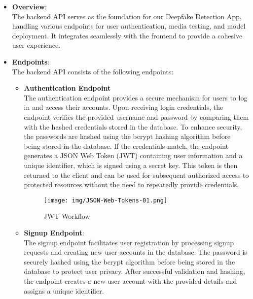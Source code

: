\begin{itemize}
      \item \textbf{Overview}:\\
            The backend API serves as the foundation for our Deepfake Detection App, handling various endpoints for user authentication, media testing, and model deployment. It integrates seamlessly with the frontend to provide a cohesive user experience.

      \item \textbf{Endpoints}:\\
            The backend API consists of the following endpoints:

            \begin{itemize}

                  \item \textbf{Authentication Endpoint}\\
                        The authentication endpoint provides a secure mechanism for users to log in and access their accounts. Upon receiving login credentials, the endpoint verifies the provided username and password by comparing them with the hashed credentials stored in the database. To enhance security, the passwords are hashed using the bcrypt hashing algorithm before being stored in the database. If the credentials match, the endpoint generates a JSON Web Token (JWT) containing user information and a unique identifier, which is signed using a secret key. This token is then returned to the client and can be used for subsequent authorized access to protected resources without the need to repeatedly provide credentials.

                        \begin{figure}[htbp]
                              \centering
                              \texttt{[image: img/JSON-Web-Tokens-01.png]}
                              \caption{JWT Workflow}
                        \end{figure}

                  \item \textbf{Signup Endpoint}:\\
                        The signup endpoint facilitates user registration by processing signup requests and creating new user accounts in the database. The password is securely hashed using the bcrypt algorithm before being stored in the database to protect user privacy. After successful validation and hashing, the endpoint creates a new user account with the provided details and assigns a unique identifier.


\end{itemize}
\end{itemize}
